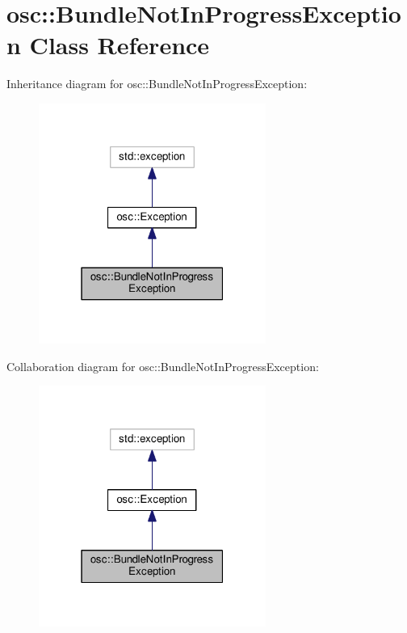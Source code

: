 \hypertarget{classosc_1_1_bundle_not_in_progress_exception}{}\section{osc\+:\+:Bundle\+Not\+In\+Progress\+Exception Class Reference}
\label{classosc_1_1_bundle_not_in_progress_exception}


Inheritance diagram for osc\+:\+:Bundle\+Not\+In\+Progress\+Exception\+:\nopagebreak
\begin{figure}[H]
\begin{center}
\leavevmode
\includegraphics[width=211pt]{classosc_1_1_bundle_not_in_progress_exception__inherit__graph}
\end{center}
\end{figure}


Collaboration diagram for osc\+:\+:Bundle\+Not\+In\+Progress\+Exception\+:\nopagebreak
\begin{figure}[H]
\begin{center}
\leavevmode
\includegraphics[width=211pt]{classosc_1_1_bundle_not_in_progress_exception__coll__graph}
\end{center}
\end{figure}
